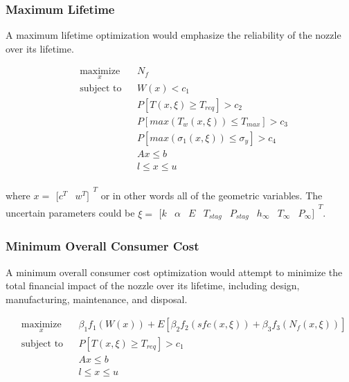 \documentclass{article}
\newcommand{\irow}[1]{%
  \begin{smallmatrix}[#1]\end{smallmatrix}%
}
\begin{document}
\subsubsection{Maximum Lifetime}

A maximum lifetime optimization would emphasize the reliability of the nozzle over its lifetime.

\begin{equation}
\label{eq:maxLifetimeFormulation}
\begin{aligned}
& \underset{x}{\text{maximize}}
& & N_f  \\
& \text{subject to}
& & W(x) < c_1 \\
& & & P [ T(x,\xi) \geq T_{req} ] > c_2 \\
& & & P [ max( T_w (x,\xi) ) \leq T_{max} ] > c_3 \\
& & & P [ max( \sigma_1 (x,\xi) ) \leq \sigma_{y} ] > c_4 \\
& & & A x \leq b \\
& & & l \leq x \leq u \\
\end{aligned}
\end{equation}

where $x = \irow{c^T & w^T}^T$ or in other words all of the geometric variables. The uncertain parameters could be $\xi = \irow{ k & \alpha & E & T_{stag} & P_{stag} & h_{\infty} & T_{\infty} & P_{\infty} }^T$.

\subsubsection{Minimum Overall Consumer Cost}

A minimum overall consumer cost optimization would attempt to minimize the total financial impact of the nozzle over its lifetime, including design, manufacturing, maintenance, and disposal.

\begin{equation}
\label{eq:minCostFormulation}
\begin{aligned}
& \underset{x}{\text{maximize}}
& & \beta_1 f_1(W(x)) + E[ \beta_2 f_2(sfc(x,\xi)) + \beta_3 f_3(N_f(x,\xi)) ]  \\
& \text{subject to}
& & P [ T(x,\xi) \geq T_{req} ] > c_1 \\
& & & A x \leq b \\
& & & l \leq x \leq u \\
\end{aligned}
\end{equation}
\end{document}
